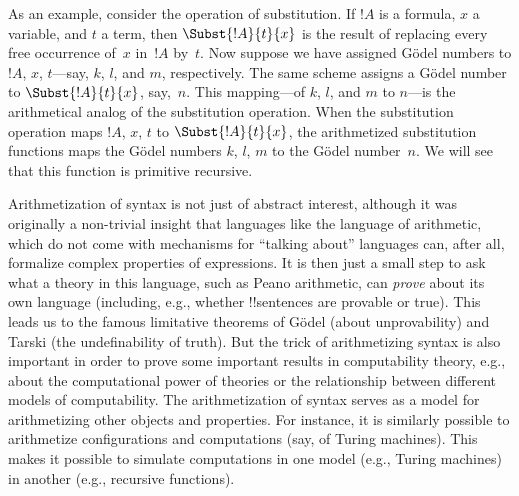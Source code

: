 \documentclass[../../../include/open-logic-section]{subfiles}
\begin{document}
As an example, consider the operation of substitution. If $!A$ is a
formula, $x$ a variable, and $t$ a term, then $\Subst{!A}{t}{x}$ is
the result of replacing every free occurrence of~$x$ in~$!A$ by~$t$.
Now suppose we have assigned G\"odel numbers to $!A$, $x$, $t$---say,
$k$, $l$, and $m$, respectively.  The same scheme assigns a G\"odel
number to $\Subst{!A}{t}{x}$, say,~$n$.  This mapping---of $k$, $l$,
and $m$ to $n$---is the arithmetical analog of the substitution
operation. When the substitution operation maps $!A$, $x$, $t$ to
$\Subst{!A}{t}{x}$, the arithmetized substitution functions maps the
G\"odel numbers $k$, $l$, $m$ to the G\"odel number~$n$.  We will see
that this function is primitive recursive.

Arithmetization of syntax is not just of abstract interest, although
it was originally a non-trivial insight that languages like the
language of arithmetic, which do not come with mechanisms for
``talking about'' languages can, after all, formalize complex
properties of expressions.  It is then just a small step to ask what a
theory in this language, such as Peano arithmetic, can \emph{prove}
about its own language (including, e.g., whether !!{sentence}s are
provable or true).  This leads us to the famous limitative theorems of
G\"odel (about unprovability) and Tarski (the undefinability of
truth). But the trick of arithmetizing syntax is also important in
order to prove some important results in computability theory, e.g.,
about the computational power of theories or the relationship between
different models of computability.  The arithmetization of syntax
serves as a model for arithmetizing other objects and properties. For
instance, it is similarly possible to arithmetize configurations and
computations (say, of Turing machines). This makes it possible to
simulate computations in one model (e.g., Turing machines) in another
(e.g., recursive functions).
\end{document}
